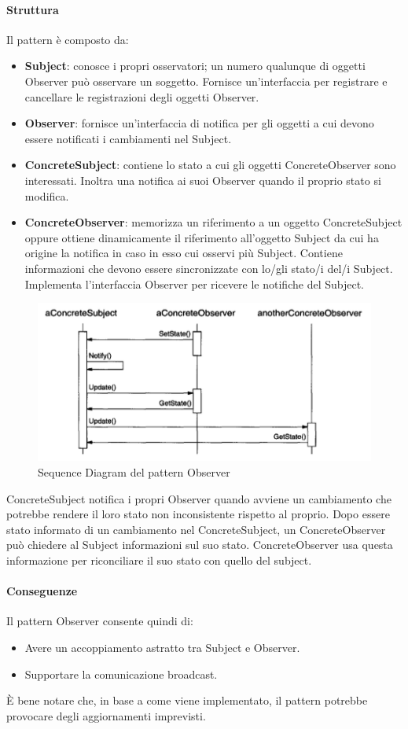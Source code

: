 \paragraph{Struttura} Il pattern è composto da:
\begin{itemize}
    \item \textbf{Subject}: conosce i propri osservatori; un numero qualunque di oggetti Observer può osservare un soggetto. Fornisce un’interfaccia per registrare e cancellare le registrazioni degli oggetti Observer.
    \item \textbf{Observer}: fornisce un’interfaccia di notifica per gli oggetti a cui devono essere notificati i cambiamenti nel Subject.
    \item \textbf{ConcreteSubject}: contiene lo stato a cui gli oggetti ConcreteObserver sono interessati. Inoltra una notifica ai suoi Observer quando il proprio stato si modifica.
    \item \textbf{ConcreteObserver}: memorizza un riferimento a un oggetto ConcreteSubject oppure ottiene dinamicamente il riferimento all’oggetto Subject da cui ha origine la notifica in caso in esso cui osservi più Subject. Contiene informazioni che devono essere sincronizzate con lo/gli stato/i del/i Subject. Implementa l’interfaccia Observer per ricevere le notifiche del Subject.
\end{itemize}


\begin{figure}[H]
    \centering
    \includegraphics[width=0.75\linewidth]{assets/pattern/observer/observer-sequence.png}
    \caption{Sequence Diagram del pattern Observer}
\end{figure}

ConcreteSubject notifica i propri Observer quando avviene un cambiamento che potrebbe rendere il loro stato non inconsistente rispetto al proprio. Dopo essere stato informato di un cambiamento nel ConcreteSubject, un ConcreteObserver può chiedere al Subject informazioni sul suo stato. ConcreteObserver usa questa informazione per riconciliare il suo stato con quello del subject.

\paragraph{Conseguenze} Il pattern Observer consente quindi di:
\begin{itemize}
    \item Avere un accoppiamento astratto tra Subject e Observer.
    \item Supportare la comunicazione broadcast.
\end{itemize}

È bene notare che, in base a come viene implementato, il pattern potrebbe provocare degli aggiornamenti imprevisti.

\newpage